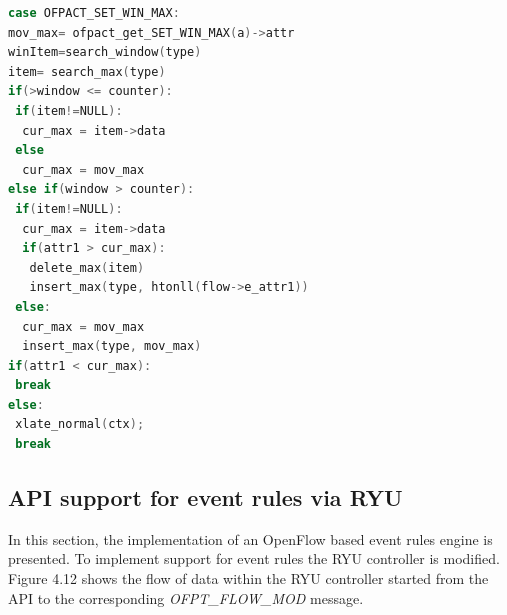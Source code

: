\begin{itemize}
\begin{lstlisting}[language=c]
case OFPACT_SET_WIN_MAX:
mov_max= ofpact_get_SET_WIN_MAX(a)->attr 
winItem=search_window(type)
item= search_max(type)
if(>window <= counter):
 if(item!=NULL):
  cur_max = item->data 
 else
  cur_max = mov_max
else if(window > counter):
 if(item!=NULL):                     
  cur_max = item->data
  if(attr1 > cur_max):
   delete_max(item)
   insert_max(type, htonll(flow->e_attr1))                     
 else:
  cur_max = mov_max
  insert_max(type, mov_max)
if(attr1 < cur_max): 
 break
else:
 xlate_normal(ctx);   
 break
\end{lstlisting} 
\end{itemize}

\subsection{API support for event rules via RYU}
In this section, the implementation of an OpenFlow based event rules engine is presented. To implement support for event rules the RYU controller is modified. Figure 4.12 shows the flow of data within the RYU controller started from the API to the corresponding \textit{OFPT_FLOW_MOD} message. 


